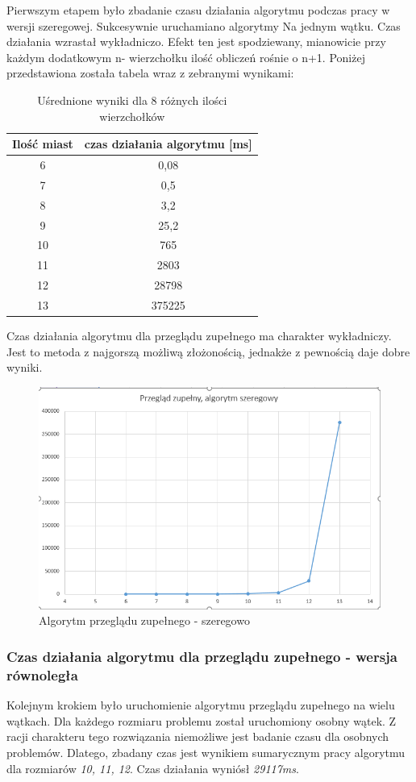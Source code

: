 \documentclass{article}
\begin{document}
		Pierwszym etapem było zbadanie czasu działania algorytmu podczas pracy w wersji szeregowej. Sukcesywnie uruchamiano algorytmy Na jednym wątku. Czas działania wzrastał wykładniczo. Efekt ten jest spodziewany, mianowicie przy każdym dodatkowym n- wierzchołku ilość obliczeń rośnie o n+1. Poniżej przedstawiona została tabela wraz z zebranymi wynikami:
		\begin{table}[H]
			\centering
			\caption{Uśrednione wyniki dla 8 różnych ilości wierzchołków}
			\begin{tabular}{|c|c|}
				
				\hline Ilość miast  & czas działania algorytmu [ms] \\ 
				\hline 	6& 0,08 \\ 
				\hline  7& 0,5 \\ 
				\hline  8& 3,2\\ 
				\hline  9& 25,2\\ 
				\hline  10& 765\\ 
				\hline  11& 2803\\ 
				\hline  12& 28798\\ 
				\hline  13& 375225\\ 
				
				\hline 
			\end{tabular} 
		\end{table}
		Czas działania algorytmu dla przeglądu zupełnego ma charakter wykładniczy. Jest to metoda z najgorszą możliwą złożonością, jednakże z pewnością daje dobre wyniki.
		\begin{figure}[bp!]
			\centering
			\includegraphics[width=0.7\linewidth]{bfS}
			\caption{Algorytm przeglądu zupełnego - szeregowo}
		\end{figure}
		\subsubsection{Czas działania algorytmu dla przeglądu zupełnego - wersja równoległa}
			Kolejnym krokiem było uruchomienie algorytmu przeglądu zupełnego na wielu wątkach. Dla każdego rozmiaru problemu został uruchomiony osobny wątek. Z racji charakteru tego rozwiązania niemożliwe jest badanie czasu dla osobnych problemów. Dlatego, zbadany czas jest wynikiem sumarycznym pracy algorytmu dla rozmiarów {\it 10, 11, 12}. Czas działania wyniósł {\it 29117ms}. 
			
\end{document}
